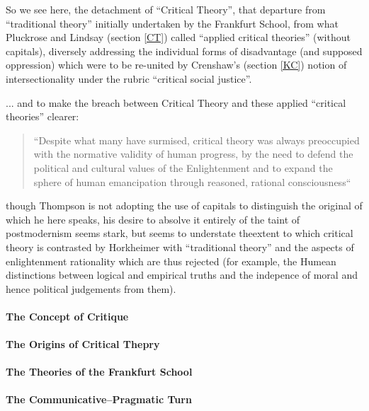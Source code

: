 \documentclass[10pt,titlepage]{book}
\begin{document}
So we see here, the detachment of ``Critical Theory'', that departure from ``traditional theory'' initially undertaken by the Frankfurt School, from what Pluckrose and Lindsay \cite{pluckrose-cynical} (section \ref{CT}) called ``applied critical theories'' (without capitals), diversely addressing the individual forms of disadvantage (and supposed oppression) which were to be re-united by Crenshaw's (section \ref{KC}) notion of intersectionality under the rubric ``critical social justice''.

... and to make the breach between Critical Theory and these applied ``critical theories'' clearer:

\begin{quotation}
``Despite what many have surmised, critical theory was always preoccupied with the normative validity of human progress, by the need to defend the political and cultural values of the Enlightenment and to expand the sphere of human emancipation through reasoned, rational consciousness``
\end{quotation}

though Thompson is not adopting the use of capitals to distinguish the original of which he here speaks, his desire to absolve it entirely of the taint of postmodernism seems stark, but seems to understate theextent to which critical theory is contrasted by Horkheimer with ``traditional theory'' and the aspects of enlightenment rationality which are thus rejected (for example, the Humean distinctions between logical and empirical truths and the indepence of moral and hence political judgements from them).

\paragraph{The Concept of Critique}

\paragraph{The Origins of Critical Thepry}

\paragraph{The Theories of the Frankfurt School}

\paragraph{The Communicative–Pragmatic Turn}
\end{document}
